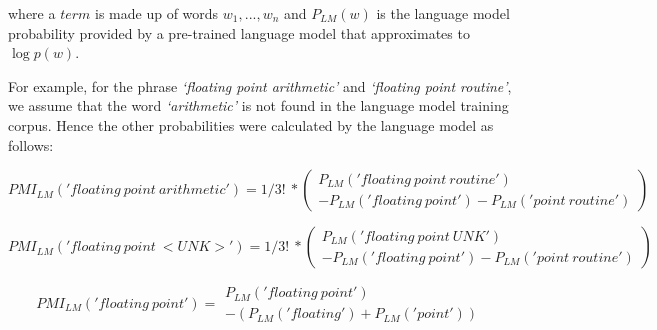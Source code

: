 where a $term$ is made up of words ${ w }_{ 1 },...,{ w }_{ n }$ and $P_{LM}(w)$ is the language model probability provided by a pre-trained language model that approximates to $\log{p(w)}$.

\iffalse


For example, for the phrase \emph{`floating point arithmetic'} and \emph{`floating point routine'}, we assume that the word \emph{`arithmetic'} is not found in the language model training corpus. Hence the other probabilities were calculated by the language model as follows:

\begin{equation}
{ PMI }_{ LM }('floating \ point \ arithmetic')=1/3! \ *
\left (
\begin{matrix} 
{ P }_{ LM }('floating \ point \ routine') \\
- { P }_{ LM }('floating \ point')
- { P }_{ LM }('point \ routine')
\end{matrix} 
\right )  
\end{equation}

\begin{equation}
{ PMI }_{ LM }('floating \ point \ <UNK>')=1/3! \ *
\left (
\begin{matrix} 
{ P }_{ LM }('floating \ point \ UNK') \\
- { P }_{ LM }('floating \ point')
- { P }_{ LM }('point \ routine')
\end{matrix} 
\right ) 
\end{equation}

\begin{equation}
{ PMI }_{ LM }('floating \ point')=
\begin{matrix} 
{ P }_{ LM }('floating \ point') \\
-({ P }_{ LM }('floating')+{ P }_{ LM }('point'))
\end{matrix} 
\end{equation}

